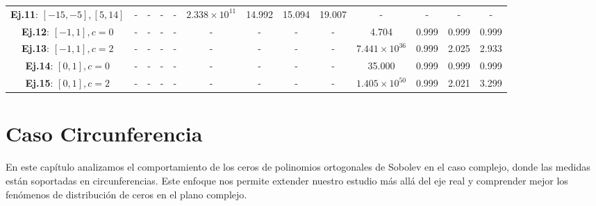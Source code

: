 \begin{table}
\begin{tabular}{|c|cccc|cccc|cccc|}
    \textbf{Ej.11}: $[-15,-5], [5,14]$         & -                                             & -                                                & -                                   & -        & $2.338\times10^{11}$ & 14.992         & 15.094                  & 19.007   & -                    & -              & -                       & -        \\
    \textbf{Ej.12}: $[-1,1], c=0$              & -                                             & -                                                & -                                   & -        & -                    & -              & -                       & -        & 4.704                & 0.999          & 0.999                   & 0.999    \\
    \textbf{Ej.13}: $[-1,1], c=2$              & -                                             & -                                                & -                                   & -        & -                    & -              & -                       & -        & $7.441\times10^{36}$ & 0.999          & 2.025                   & 2.933    \\
    \textbf{Ej.14}: $[0,1], c=0$               & -                                             & -                                                & -                                   & -        & -                    & -              & -                       & -        & 35.000               & 0.999          & 0.999                   & 0.999    \\
    \textbf{Ej.15}: $[0,1], c=2$               & -                                             & -                                                & -                                   & -        & -                    & -              & -                       & -        & $1.405\times10^{50}$ & 0.999          & 2.021                   & 3.299    \\
    \hline
  \end{tabular}
\end{table}

\newpage

\section{Caso Circunferencia}

En este capítulo analizamos el comportamiento de los ceros de polinomios ortogonales de Sobolev en el caso complejo, donde las medidas están soportadas en circunferencias. Este enfoque nos permite extender nuestro estudio más allá del eje real y comprender mejor los fenómenos de distribución de ceros en el plano complejo.

